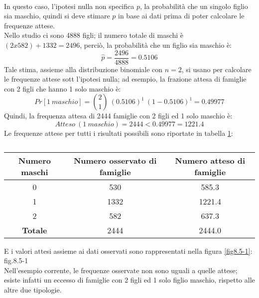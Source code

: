 \documentclass[drafts, 10pt]{book}
\newcounter{example}[section]
\begin{document}
\begin{example}
    \\
    In questo caso, l'ipotesi nulla non specifica $p$, la probabilità che un singolo figlio sia maschio, quindi si deve stimare $p$ in base ai dati prima di poter calcolare le frequenze attese.
    \\
    Nello studio ci sono 4888 figli; il numero totale di maschi è $(2 x 582) + 1332 = 2496$, perciò, la probabilità che un figlio sia maschio è:
    \begin{equation}
    \hat{p} = \frac{2496}{4888} = 0.5106
    \end{equation}
    Tale stima, assieme alla distribuzione binomiale con $n = 2$, si usano per calcolare le frequenze attese sott l'ipotesi nulla; ad esempio, la frazione attesa di famiglie con 2 figli che hanno 1 solo maschio è:
    \begin{equation}
    Pr[1\ maschio] = \binom{2}{1}\ (0.5106)^1\ (1-0.5106)^1 = 0.49977
    \end{equation}
    Quindi, la frequenza attesa di 2444 famiglie con 2 figli ed 1 solo maschio è:
    \begin{equation}
    Atteso\ (1\ maschio) = 2444 < 0.49977 = 1221.4
    \end{equation}
    Le frequenze attese per tutti i risultati possibili sono riportate in tabella \ref{tabmaschi2}:
    \begin{table}[H]
        \centering
        \renewcommand\arraystretch{1.2}
        \begin{tabular}{c|c|c}
        \hline
        \textbf{Numero maschi} & \textbf{Numero osservato di famiglie} & \textbf{Numero atteso di famiglie}\\
        \hline
        0 & 530 & 585.3\\
        1 & 1332 & 1221.4\\
        2 & 582 & 637.3\\
        \hline
        \textbf{Totale} & 2444 & 2444.0\\
        \hline
        \end{tabular}
        \caption{}
        \label{tabmaschi2}
    \end{table}\noindent
    E i valori attesi assieme ai dati osservati sono rappresentati nella figura \ref{fig8.5-1}:
    \\
    fig.8.5-1\label{fig8.5-1} %
    \\
    Nell'esempio corrente, le frequenze osservate non sono uguali a quelle attese; esiste infatti un eccesso di famiglie con 2 figli ed 1 solo figlio maschio, rispetto alle altre due tipologie.

\end{example}
\end{document}
